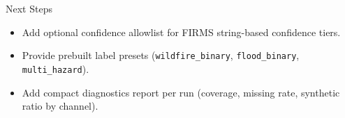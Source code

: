 \documentclass{beamer}
\begin{document}
\begin{frame}{Next Steps}
\begin{itemize}
  \item Add optional confidence allowlist for FIRMS string-based confidence tiers.
  \item Provide prebuilt label presets (\texttt{wildfire\_binary}, \texttt{flood\_binary}, \texttt{multi\_hazard}).
  \item Add compact diagnostics report per run (coverage, missing rate, synthetic ratio by channel).
\end{itemize}
\end{frame}
\end{document}
